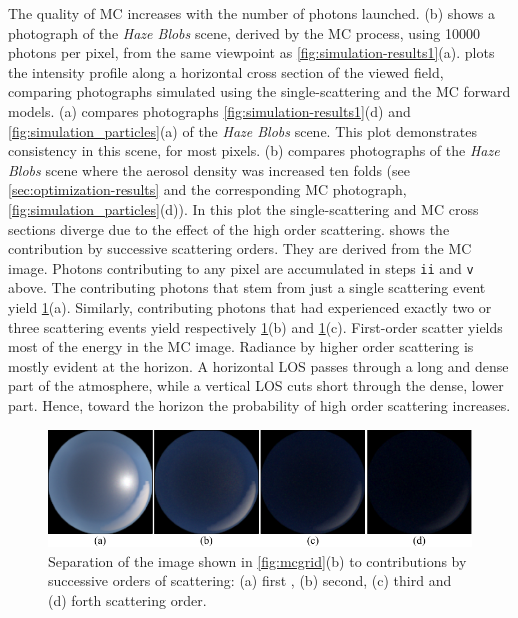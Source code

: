 \documentclass[10pt,letterpaper]{article}
\newcommand{\yoavcomment}[1]{}
\renewcommand{\yoavcomment}[1]{#1} %
\begin{document}
The quality of MC increases with the number of photons launched.
(b) shows a photograph of the {\em Haze Blobs}
scene, derived by the MC process, using \num{10000} photons per pixel,
from the same viewpoint as \cref{fig:simulation-results1}(a).
 plots the intensity profile
along a horizontal cross section of the viewed field,
comparing photographs simulated using the single-scattering and the  MC forward models.
(a) compares photographs \cref{fig:simulation-results1}(d)
and \cref{fig:simulation_particles}(a) of the {\em Haze Blobs} scene.
This plot demonstrates consistency in this scene, for most pixels.
(b) compares photographs of the {\em Haze Blobs} scene
where the aerosol density was increased ten folds (see \cref{sec:optimization-results}
and the corresponding MC photograph, \cref{fig:simulation_particles}(d)).
In this plot the single-scattering and MC cross sections diverge
due to the effect of the high order scattering.
 shows the contribution by successive
scattering orders. They are derived from the MC image. Photons contributing
to any pixel are accumulated in steps {\tt ii} and {\tt v} above.
The contributing photons that stem from just a single scattering event yield
\cref{fig:scatter_order}(a). Similarly, contributing photons that had
experienced exactly  two or three scattering events yield respectively
\cref{fig:scatter_order}(b) and \cref{fig:scatter_order}(c). First-order
scatter yields most of the energy in the MC image. Radiance by higher order scattering
is mostly evident at the horizon. A horizontal LOS passes through a long
and dense part of the atmosphere, while a vertical LOS cuts short through
the dense, lower part. Hence, toward the horizon the probability of high
order scattering increases.
\begin{figure}[bt]
  \centering
  \yoavcomment{\includegraphics{images/scatter_order.pdf}}
  \caption{\small Separation of the image shown in \cref{fig:mcgrid}(b) to contributions
   by successive orders of scattering: (a) first , (b) second, (c) third and (d) forth scattering order.}
  \label{fig:scatter_order}
\end{figure}
\end{document}
